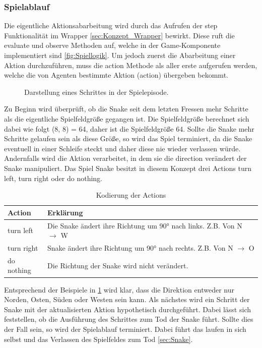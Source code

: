 \subsubsection{Spielablauf}
Die eigentliche Aktionsabarbeitung wird durch das Aufrufen der step Funktionalität im Wrapper \ref{sec:Konzept_Wrapper} bewirkt. Diese ruft die evaluate und observe Methoden auf, welche in der Game-Komponente implementiert sind \ref{fig:Spiellogik}.
Um jedoch zuerst die Abarbeitung einer Aktion durchzuführen, muss die action Methode als aller erste aufgerufen werden, welche die von Agenten bestimmte Aktion (action) übergeben bekommt. 
\begin{figure}[H]
	\centering
	\def\svgscale{0.105}
	
	\caption[Spielablauf]{Darstellung eines Schrittes in der Spielepisode.}
	\label{fig:Spielablauf}
\end{figure}
Zu Beginn wird überprüft, ob die Snake seit dem letzten Fressen mehr Schritte als die eigentliche Spielfeldgröße gegangen ist. Die Spielfeldgröße berechnet sich dabei wie folgt (8, 8) = 64, daher ist die Spielfeldgröße 64. Sollte die Snake mehr Schritte gelaufen sein als diese Größe, so wird das Spiel terminiert, da die Snake eventuell in einer Schleife steckt und daher diese nie wieder verlassen würde.\\
Andernfalls wird die Aktion verarbeitet, in dem sie die direction verändert der Snake manipuliert. Das Spiel Snake besitzt in diesem Konzept drei Actions turn left, turn right oder do nothing.
\begin{longtable}[h]{|p{4cm}|p{\linewidth - 5cm}|}
	\caption{Kodierung der Actions}
	\label{tab:Aktionscodierung} 
	\endfirsthead
	\endhead
	\hline
	Action & Erklärung \\
	\hline
	turn left & Die Snake ändert ihre Richtung um 90° nach links. Z.B. Von N $\longrightarrow$ W \\
	\hline
	turn right & Snake ändert ihre Richtung um 90° nach rechts. Z.B. Von N $\longrightarrow$ O \\
	\hline
	do nothing & Die Richtung der Snake wird nicht verändert. \\
	\hline
\end{longtable}
Entsprechend der Beispiele in \ref{tab:Aktionscodierung} wird klar, dass die Direktion entweder nur Norden, Osten, Süden oder Westen sein kann.
Als nächstes wird ein Schritt der Snake mit der aktualisierten Aktion hypothetisch durchgeführt. Dabei lässt sich feststellen, ob die Ausführung des Schrittes zum Tod der Snake führt. Sollte dies der Fall sein, so wird der Spielablauf terminiert. Dabei führt das laufen in sich selbst und das Verlassen des Spielfeldes zum Tod \ref{sec:Snake}. \\ 
